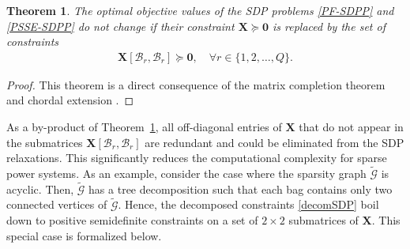 \documentclass[journal,twoside]{IEEEtran}
\newtheorem{theorem}{Theorem}
\newcommand{\bX}{\mathbf{X}}
\newcommand{\cB}{{\mathcal B}}
\begin{document}
\begin{theorem}\label{chor_them_1}
The optimal objective values of the SDP problems \eqref{PF-SDPP} and \eqref{PSSE-SDPP}  do not change if
their constraint $\bX \succeq \mathbf{0}$ is replaced by the set of constraints
\begin{align}\label{decomSDP}
  \bX[\cB_r,\cB_r] \succeq \mathbf{0}, \quad \forall r\in\{ 1,2,\ldots,Q\}.
\end{align}
\end{theorem}
\begin{proof}
This theorem is a direct consequence of the matrix completion theorem and chordal extension \cite{Grone1984}.
\end{proof}

As a by-product of Theorem~\ref{chor_them_1}, all off-diagonal entries of $\bX$ that do not appear in the submatrices $\bX[\cB_r,\cB_r]$ are redundant and could be eliminated from the SDP relaxations. This significantly reduces the computational complexity for sparse power systems. As an example, consider the case where  the sparsity graph  $\tilde{\mathcal G}$ is acyclic. Then,  $\tilde{\mathcal G}$ has a tree decomposition
such that each bag contains only two connected vertices of $\tilde{\mathcal G}$.
Hence, the decomposed constraints \eqref{decomSDP}
boil down to positive semidefinite constraints on a set of $2 \times 2$ submatrices of $\bX$.
This special case is formalized below.
\end{document}
